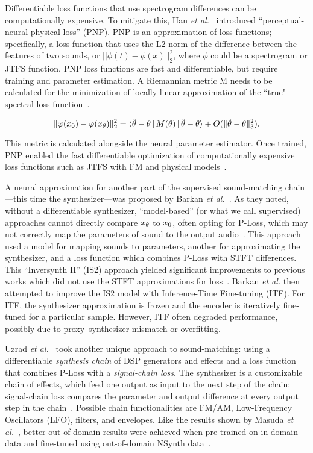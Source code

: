Differentiable loss functions that use spectrogram differences can be computationally expensive. To mitigate this, Han \textit{et al.}~\cite{han2023perceptual} introduced ``perceptual-neural-physical loss'' (PNP). PNP is an approximation of loss functions; specifically, a loss function that uses the L2 norm of the difference between the features of two sounds, or $||\phi(t) - \phi(x)||^2_2$, where $\phi$ could be a spectrogram or JTFS function. PNP loss functions are fast and differentiable, but require training and parameter estimation. A Riemannian metric M needs to be calculated for the minimization of locally linear approximation of the ``true" spectral loss function~\cite{han2023perceptual}. 

\[
\| \varphi(x_{0}) - \varphi(x_{\theta}) \|_2^2
= \langle \tilde{\theta} - \theta \,|\, M(\theta) \,|\, \tilde{\theta} - \theta \rangle
+ O(\|\tilde{\theta} - \theta\|_3^2).
\]

This metric is calculated alongside the neural parameter estimator. Once trained, PNP enabled the fast differentiable optimization of computationally expensive loss functions such as JTFS with FM and physical models~\cite{han2023perceptual,han2024learning}.

A neural approximation for another part of the supervised sound-matching chain---this time the synthesizer---was proposed by Barkan \textit{et al.}~\cite{barkan2023inversynthII}. As they noted, without a differentiable synthesizer, ``model-based'' (or what we call supervised) approaches cannot directly compare $x_{\theta}$ to $x_{0}$, often opting for P-Loss, which may not correctly map the parameters of sound to the output audio~\cite{esling2019flow,han2023perceptual,masuda2023improving}. This approach used a model for mapping sounds to parameters, another for approximating the synthesizer, and a loss function which combines P-Loss with STFT differences. This ``Inversynth II'' (IS2) approach yielded significant improvements to previous works which did not use the STFT approximations for loss~\cite{esling2019flow,barkan2019inversynth}. Barkan \textit{et al.} then attempted to improve the IS2 model with Inference-Time
Fine-tuning (ITF). For ITF, the synthesizer approximation is frozen and the encoder is iteratively fine-tuned for a particular sample. However, ITF often degraded performance, possibly due to proxy–synthesizer mismatch or overfitting.

Uzrad \textit{et al.}~\cite{uzrad2024diffmoog} took another unique approach to sound-matching: using a differentiable \textit{synthesis chain} of DSP generators and effects and a loss function that combines P-Loss with a \textit{signal-chain loss}. The synthesizer is a customizable chain of effects, which feed one output as input to the next step of the chain; signal-chain loss compares the parameter and output difference at every output step in the chain~\cite{uzrad2024diffmoog}. Possible chain functionalities are FM/AM, Low-Frequency Oscillators (\gls{LFO}), filters, and envelopes. Like the results shown by Masuda \textit{et al.}~\cite{masuda2021soundmatch}, better out-of-domain results were achieved when pre-trained on in-domain data and fine-tuned using out-of-domain NSynth data~\cite{engel2017neural}.


